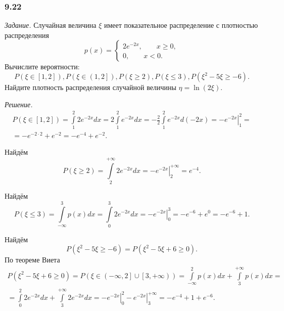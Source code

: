 \subsubsection*{9.22}

\textit{Задание.} Случайная величина $ \xi $ имеет показательное распределение с плотностью распределения
$$p \left( x \right) =
\begin{cases}
2e^{-2x}, \qquad x \geq 0, \\
0, \qquad x < 0.
\end{cases}$$
Вычислите вероятности:
$$P \left( \xi \in \left[ 1, 2 \right] \right),
P \left( \xi \in \left( 1, 2 \right] \right),
P \left( \xi \geq 2 \right),
P \left( \xi \leq 3 \right),
P \left( \xi^2 - 5 \xi \geq -6 \right).$$
Найдите плотность распределения случайной величины $ \eta = \ln \left( 2 \xi \right) $.

\textit{Решение.}
\begin{equation*}
\begin{split}
P \left( \xi \in \left[ 1, 2 \right] \right) =
\int \limits_1^2 2e^{-2x}dx =
2 \int \limits_1^2 e^{-2x}dx =
- \frac{2}{2} \int \limits_1^2 e^{-2x}d \left( -2x \right) =
\left. -e^{-2x} \right|_1^2 = \\
= -e^{-2 \cdot 2} + e^{-2} =
-e^{-4} + e^{-2}.
\end{split}
\end{equation*}

Найдём
$$P \left( \xi \geq 2 \right) =
\int \limits_2^{+ \infty } 2e^{-2x}dx =
\left. -e^{-2x} \right|_2^{+ \infty } =
e^{-4}.$$

Найдём
$$P \left( \xi \leq 3 \right) =
\int \limits_{- \infty }^3 p \left( x \right) dx =
\int \limits_0^3 2e^{-2x}dx =
\left. -e^{-2x} \right|_0^3 =
-e^{-6} + e^0 =
-e^{-6} + 1.$$

Найдём
$$P \left( \xi^2 - 5 \xi \geq -6 \right) =
P \left( \xi^2 - 5 \xi + 6 \geq 0 \right).$$
По теореме Виета
\begin{equation*}
\begin{split}
P \left( \xi^2 - 5 \xi + 6 \geq 0 \right) =
P \left( \xi \in \left( - \infty, 2 \right] \cup \left[ 3, + \infty \right) \right) =
\int \limits_{- \infty }^2 p \left( x \right) dx + \int \limits_3^{+ \infty } p \left( x \right) dx = \\
= \int \limits_0^2 2e^{-2x}dx + \int \limits_3^{+ \infty } 2e^{-2x}dx =
\left. -e^{-2x} \right|_0^2 - \left. e^{-2x} \right|_3^{+ \infty } =
-e^{-4} + 1 + e^{-6}.
\end{split}
\end{equation*}

